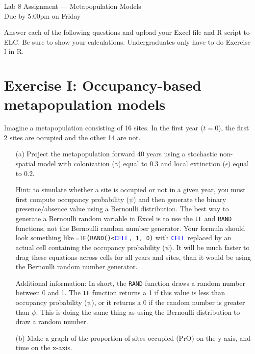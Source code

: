 \documentclass[12pt]{article}\usepackage[]{graphicx}\usepackage[]{xcolor}
\begin{document}
{
  \Large
  \centering
  Lab 8 Assignment --- Metapopulation Models \\
  Due by 5:00pm on Friday \\
}

\vspace{6pt}

Answer each of the following questions and upload your Excel file and
R script to ELC. Be sure to show your calculations. Undergraduates
only have to do Exercise I in R. \\

\vspace{6pt}

\section*{Exercise I: Occupancy-based metapopulation models}


Imagine a metapopulation consisting of 16 sites. In the first year
($t=0$), the first 2 sites are occupied and the other 14 are not.
\begin{enumerate}
  \item[(a)] Project the metapopulation forward 40 years using a
    stochastic non-spatial model with colonization ($\gamma$) equal to
    0.3 and local extinction ($\epsilon$) equal to 0.2.

    Hint: to simulate whether a site is occupied or not in a given year,
    you must first compute occupancy probability ($\psi$) and then generate
    the binary presence/absence value using a Bernoulli distribution. The
    best way to generate a Bernoulli random variable in Excel is to use
    the \texttt{IF} and \texttt{RAND} functions, not the Bernoulli
    random number generator. Your formula should look something like
    \texttt{=IF(RAND()<\textcolor{blue}{CELL}, 1, 0)} with
    \texttt{\textcolor{blue}{CELL}} replaced by an  
    actual cell containing the occupancy probability
    ($\psi$). It will be much faster to drag these equations across
    cells for all years and sites, than it would be using the
    Bernoulli random number generator.

    Additional information: In short, the \texttt{RAND} function draws a
    random number between 0 and 1. The \texttt{IF} function returns a 1 if
    this value is less than occupancy probability ($\psi$), or it returns
    a 0 if the random number is greater than $\psi$. This is doing the
    same thing as using the Bernoulli distribution to draw a random
    number.
  \item[(b)] Make a graph of the proportion of sites occupied (PrO)
    on the y-axis, and time on the x-axis.
\end{enumerate}
\end{document}
